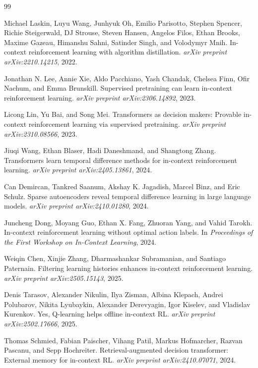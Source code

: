 \documentclass[10pt,twocolumn,letterpaper]{article}
\begin{document}
\begin{thebibliography}{99}

Michael Laskin, Luyu Wang, Junhyuk Oh, Emilio Parisotto, Stephen Spencer, Richie Steigerwald, DJ Strouse, Steven Hansen, Angelos Filos, Ethan Brooks, Maxime Gazeau, Himanshu Sahni, Satinder Singh, and Volodymyr Mnih.
\newblock In-context reinforcement learning with algorithm distillation.
\newblock \emph{arXiv preprint arXiv:2210.14215}, 2022.

Jonathan N. Lee, Annie Xie, Aldo Pacchiano, Yash Chandak, Chelsea Finn, Ofir Nachum, and Emma Brunskill.
\newblock Supervised pretraining can learn in-context reinforcement learning.
\newblock \emph{arXiv preprint arXiv:2306.14892}, 2023.

Licong Lin, Yu Bai, and Song Mei.
\newblock Transformers as decision makers: Provable in-context reinforcement learning via supervised pretraining.
\newblock \emph{arXiv preprint arXiv:2310.08566}, 2023.

Jiuqi Wang, Ethan Blaser, Hadi Daneshmand, and Shangtong Zhang.
\newblock Transformers learn temporal difference methods for in-context reinforcement learning.
\newblock \emph{arXiv preprint arXiv:2405.13861}, 2024.

Can Demircan, Tankred Saanum, Akshay K. Jagadish, Marcel Binz, and Eric Schulz.
\newblock Sparse autoencoders reveal temporal difference learning in large language models.
\newblock \emph{arXiv preprint arXiv:2410.01280}, 2024.

Juncheng Dong, Moyang Guo, Ethan X. Fang, Zhuoran Yang, and Vahid Tarokh.
\newblock In-context reinforcement learning without optimal action labels.
\newblock In \emph{Proceedings of the First Workshop on In-Context Learning}, 2024.

Weiqin Chen, Xinjie Zhang, Dharmashankar Subramanian, and Santiago Paternain.
\newblock Filtering learning histories enhances in-context reinforcement learning.
\newblock \emph{arXiv preprint arXiv:2505.15143}, 2025.

Denis Tarasov, Alexander Nikulin, Ilya Zisman, Albina Klepach, Andrei Polubarov, Nikita Lyubaykin, Alexander Derevyagin, Igor Kiselev, and Vladislav Kurenkov.
\newblock Yes, Q-learning helps offline in-context RL.
\newblock \emph{arXiv preprint arXiv:2502.17666}, 2025.

Thomas Schmied, Fabian Paischer, Vihang Patil, Markus Hofmarcher, Razvan Pascanu, and Sepp Hochreiter.
\newblock Retrieval-augmented decision transformer: External memory for in-context RL.
\newblock \emph{arXiv preprint arXiv:2410.07071}, 2024.


\end{thebibliography}
\end{document}
